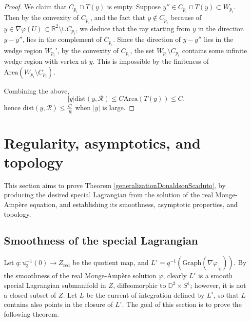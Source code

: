 \documentclass[11pt]{article}
\begin{document}
\begin{proof}
We claim that $C_{p_i}\cap T(y)$ is empty.
Suppose $y''\in C_{p_i}\cap T(y) \subset W_{p_i}$. Then by the convexity of $C_{p_i}$, and the fact that  $y\notin C_{p_i}$ because of $y\in \nabla \varphi(U)\subset \mathbb{R}^2\setminus \cup C_{p_i}$, we deduce that the ray starting from $y$ in the direction $y-y''$, lies in the complement of $C_{p_i}$. Since the direction of $y-y''$ lies in the wedge region $W_{p_i}'$,  by the convexity of $C_{p_i}$, the set $W_{p_i}\setminus C_{p_i}$ contains some infinite wedge region with vertex at $y$. This is impossible by the finiteness of $\text{Area}(W_{p_i}\setminus C_{p_i})$.


Combining the above,
\[
|y| \text{dist}(y, \mathcal{R}) \leq C \text{Area}(T(y)) \leq C, 
\]
hence $\text{dist}(y, \mathcal{R}) \leq \frac{C}{ |y|  }$ when $|y|$ is large.







    \vspace{5pt}
    

\end{proof}




\section{Regularity, asymptotics, and topology}

This section aims
to prove Theorem \ref{generalizationDonaldsonScaduto}, by producing the desired special Lagrangian from the solution of the real Monge-Amp\`ere equation, and establishing its smoothness, asymptotic properties, and topology.













\subsection{Smoothness of the special Lagrangian}\label{tangentcone}



Let $q: u_3^{-1}(0) \to Z_{\text{red}}$ be the quotient map, and $L^{\circ} = q^{-1}(\text{Graph}(\nabla \varphi
_{|_{U}}))$. By the smoothness of the real Monge-Amp\`ere solution $\varphi$, clearly $L^{\circ}$ is a smooth special Lagrangian submanifold in $Z$, diffeomorphic to  $\mathbb{D}^2 \times S^1$; however, it is not a closed subset of $Z$. Let $L$ be the current of integration defined by $L^\circ$, so that $L$ contains also points in the closure of $L^\circ$. The goal of this section is to prove the following theorem.
\end{document}
